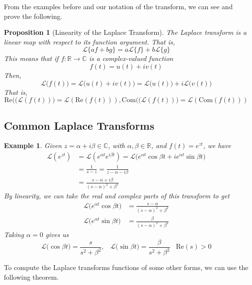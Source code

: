 \documentclass{article}
\newtheorem{proposition}[theorem]{Proposition}
\newtheorem{example}{Example}[section]
\theoremstyle{remark}
\theoremstyle{definition}
\begin{document}
From the examples before and our notation of the transform, we can see and prove the following. 

\begin{proposition}[Linearity of the Laplace Transform]
The Laplace transform is a linear map with respect to its function argument. That is, 
\[\mathcal{L} \{a f + b g\} = a \mathcal{L}\{f\} + b \mathcal{L}\{g\}\]
This means that if $f: \mathbb{R} \longrightarrow \mathbb{C}$ is a complex-valued function
\[f(t) = u(t) + i v(t)\]
Then, 
\[\mathcal{L}\big(f(t)\big) = \mathcal{L}\big(u(t) + i v(t) \big) = \mathcal{L} \big( u(t) \big) + i \mathcal{L} \big( v(t)\big)\]
That is, 
\[\text{Re}\big((\mathcal{L}(f(t))\big) = \mathcal{L}( \text{Re}(f(t))), \text{Com}\big((\mathcal{L}(f(t))\big) = \mathcal{L}( \text{Com}(f(t)))\]
\end{proposition}


\subsection{Common Laplace Transforms}

\begin{example}
Given $z = \alpha + i \beta \in \mathbb{C}$, with $\alpha, \beta \in \mathbb{R}$, and $f(t) = e^{zt}$, we have
\begin{align*}
    \mathcal{L} (e^{zt}) & = \mathcal{L} (e^{\alpha t} e^{i \beta t}) = \mathcal{L} \big( e^{\alpha t} \cos{\beta t} + i e^{\alpha t} \sin{\beta t}\big) \\
    & = \frac{1}{s-z} = \frac{1}{z - \alpha - i \beta} \\
    & = \frac{s - \alpha + i \beta}{(s-\alpha)^2 + \beta^2}
\end{align*}
By linearity, we can take the real and complex parts of this transform to get
\begin{align}
    \mathcal{L} \big(e^{\alpha t} \cos{\beta t} \big) & = \frac{s-\alpha}{(s-\alpha)^2 + \beta^2} \\
    \mathcal{L} \big(e^{\alpha t} \sin{\beta t} \big) & = \frac{\beta}{(s-\alpha)^2 + \beta^2}
\end{align}
Taking $\alpha = 0$ gives us
\[\mathcal{L} \big( \cos{\beta t}\big) = \frac{s}{s^2 + \beta^2}, \;\;\; \mathcal{L}\big( \sin{\beta t}\big) = \frac{\beta}{s^2 + \beta^2} \;\;\; \text{Re}(s) > 0\]
\end{example}

To compute the Laplace transforms functions of some other forms, we can use the following theorem. 
\end{document}
